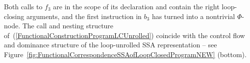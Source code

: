 Both calls to $f_3$ are in the scope of its declaration and contain
the right loop-closing arguments, and the first instruction in $b_3$
has turned into a nontrivial $\Phi$-node. The call and nesting
structure of~(\ref{FunctionalConstructionProgramLCUnrolled}) coincide
with the control flow and dominance structure of the loop-unrolled SSA
representation -- see
Figure~\ref{fig:FunctionalCorrespondenceSSAofLoopClosedProgramNEW}
(bottom).


